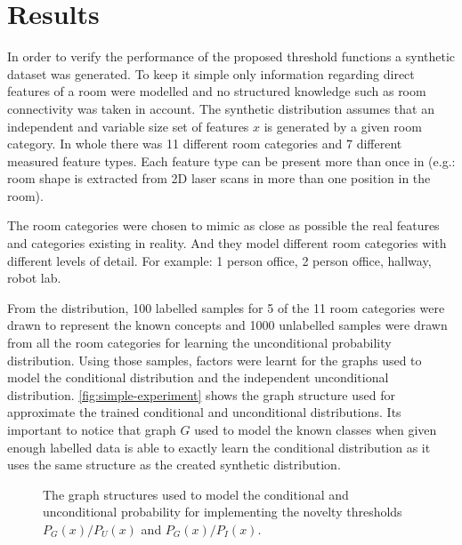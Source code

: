 \documentclass[runningheads,a4paper]{llncs}
\begin{document}
\section{Results}
In order to verify the performance of the proposed threshold functions a synthetic dataset
was generated. To keep it simple only information regarding direct features of
a room were modelled and no structured knowledge such as room connectivity was taken
in account.
The synthetic distribution assumes that an independent and variable size set of features
$x$ is generated by a given room category.
In whole there was 11 different room categories and 7 different measured feature
types. Each feature type can be present more than once in (e.g.: room shape is
extracted from 2D laser scans in more than one position in the room).

The room categories were chosen to mimic as close as possible the real features and
categories existing in reality. And they model different room categories with
different levels of detail. For example: 1 person office, 2 person office, hallway,
robot lab.

From the distribution, 100 labelled samples for 5 of the 11 room categories were
drawn to represent the known concepts and 1000 unlabelled samples were drawn from
all the room categories for learning the unconditional probability distribution.
Using those samples, factors were learnt for the graphs used to model the
conditional distribution and the independent unconditional distribution.
\autoref{fig:simple-experiment} shows the graph structure used for approximate the
trained conditional and unconditional distributions.
Its important to notice that graph $G$ used to model the known classes when given
enough labelled data is able to exactly learn the conditional distribution as it
uses the same structure as the created synthetic distribution.

\begin{figure}[h]
\centering

\qquad
{}
\qquad
{}

\caption{\label{fig:simple-experiment}The graph structures used to model the
         conditional and unconditional probability for implementing the novelty
         thresholds $P_G(x)/P_U(x)$ and $P_G(x)/P_I(x)$.}
\end{figure}
\end{document}
